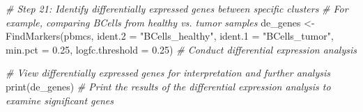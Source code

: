 \documentclass[
]{article}
\newenvironment{Shaded}{\begin{snugshade}}{\end{snugshade}}
\newcommand{\AttributeTok}[1]{\textcolor[rgb]{0.77,0.63,0.00}{#1}}
\newcommand{\CommentTok}[1]{\textcolor[rgb]{0.56,0.35,0.01}{\textit{#1}}}
\newcommand{\FloatTok}[1]{\textcolor[rgb]{0.00,0.00,0.81}{#1}}
\newcommand{\FunctionTok}[1]{\textcolor[rgb]{0.00,0.00,0.00}{#1}}
\newcommand{\NormalTok}[1]{#1}
\newcommand{\OtherTok}[1]{\textcolor[rgb]{0.56,0.35,0.01}{#1}}
\newcommand{\StringTok}[1]{\textcolor[rgb]{0.31,0.60,0.02}{#1}}
\begin{document}
\begin{Shaded}
\begin{Highlighting}[]
\CommentTok{\# Step 21: Identify differentially expressed genes between specific clusters}
\CommentTok{\# For example, comparing BCells from healthy vs. tumor samples}
\NormalTok{de\_genes }\OtherTok{\textless{}{-}} \FunctionTok{FindMarkers}\NormalTok{(pbmcs, }\AttributeTok{ident.2 =} \StringTok{"BCells\_healthy"}\NormalTok{, }\AttributeTok{ident.1 =} \StringTok{"BCells\_tumor"}\NormalTok{,}
                        \AttributeTok{min.pct =} \FloatTok{0.25}\NormalTok{, }\AttributeTok{logfc.threshold =} \FloatTok{0.25}\NormalTok{)  }\CommentTok{\# Conduct differential expression analysis}

\CommentTok{\# View differentially expressed genes for interpretation and further analysis}
\FunctionTok{print}\NormalTok{(de\_genes)  }\CommentTok{\# Print the results of the differential expression analysis to examine significant genes}
\end{Highlighting}
\end{Shaded}
\end{document}
